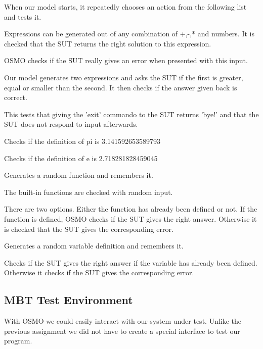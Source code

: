 \documentclass[11pt,a4paper]{article}
\begin{document}
When our model starts, it repeatedly chooses an action from the following list and tests it.
\begin{description}[labelindent=1cm]
	\item[\textbf{Expression}] Expressions can be generated out of any combination of +,-,* and numbers. It is checked that the SUT returns the right solution to this expression.
	\item[\textbf{1/0}] OSMO checks if the SUT really gives an error when presented with this input.
	\item[\textbf{equality}] Our model generates two expressions and asks the SUT if the first is greater, equal or smaller than the second. It then checks if the answer given back is correct.
	\item[\textbf{exit}] This tests that giving the 'exit' commando to the SUT returns 'bye!' and that the SUT does not respond to input afterwards.
	\item[\textbf{pi}] Checks if the definition of pi is 3.141592653589793
	\item[\textbf{e}] Checks if the definition of e is 2.718281828459045
	\item[\textbf{function definition}] Generates a random function and remembers it.
	\item[\textbf{built-in functions}] The built-in functions are checked with random input.
	\item[\textbf{function application}] There are two options. Either the function has already been defined or not. If the function is defined, OSMO checks if the SUT gives the right answer. Otherwise it is checked that the SUT gives the corresponding error.
	\item[\textbf{variable definition}] Generates a random variable definition and remembers it.
	\item[\textbf{variable application}] Checks if the SUT gives the right answer if the variable has already been defined. Otherwise it checks if the SUT gives the corresponding error.
\end{description}



\subsection{MBT Test Environment}
With OSMO we could easily interact with our system under test. Unlike
the previous assignment we did not have to create a special interface
to test our program.
\end{document}
